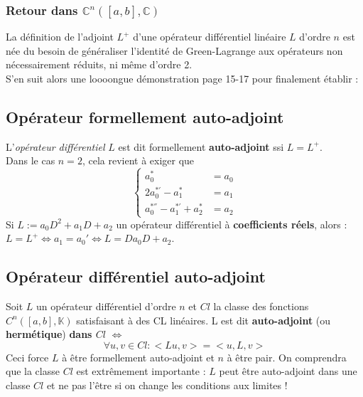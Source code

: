 \documentclass[11pt, a4paper, openany]{book}
\begin{document}
		\subsubsection{Retour dans $\mathbb{C}^n([a,b],\mathbb{C})$}
		La définition de l'adjoint $L^+$ d'une opérateur différentiel linéaire $L$ d'ordre $n$ est née du besoin de généraliser l'identité de Green-Lagrange aux opérateurs non nécessairement réduits, ni même d'ordre 2.\\
		S'en suit alors une loooongue démonstration page 15-17 pour finalement établir :\\
													
													
		\subsection{Opérateur formellement auto-adjoint}
		L'\textit{opérateur différentiel} $L$ est dit formellement \textbf{auto-adjoint} ssi $L = L^+$.\\
		Dans le cas $n=2$, cela revient à exiger que
		\begin{equation}
			\left\{\begin{array}{ll}
			a_0^* &= a_0\\
			2a_{0}^{*'}- a_1^* &= a_1\\
			a_0^{*''} - a_1^{*'} + a_2^* &= a_2
			\end{array}\right.
		\end{equation}
		Si $L:= a_0D^2 + a_1D + a_2$ un opérateur différentiel à \textbf{coefficients réels}, alors : $L = L^+ \Leftrightarrow a_1 = a_0' \Leftrightarrow L = Da_0D + a_2$.
													
		\subsection{Opérateur différentiel auto-adjoint}
		Soit $L$ un opérateur différentiel d'ordre $n$ et $Cl$ la classe des fonctions $C^n([a,b],\mathbb{K})$ satisfaisant à des CL linéaires. L est dit \textbf{auto-adjoint} (ou \textbf{hermétique}) \textbf{dans $Cl$} $\Leftrightarrow$
		\begin{equation}
			\forall u,v \in Cl : <Lu,v> = <u,L,v>
		\end{equation}
		Ceci force $L$ à être formellement auto-adjoint et $n$ à être pair.  On comprendra que la classe $Cl$ est extrêmement importante : $L$ peut être auto-adjoint dans une classe $Cl$ et ne pas l'être si on change les conditions aux limites !
													
\end{document}
